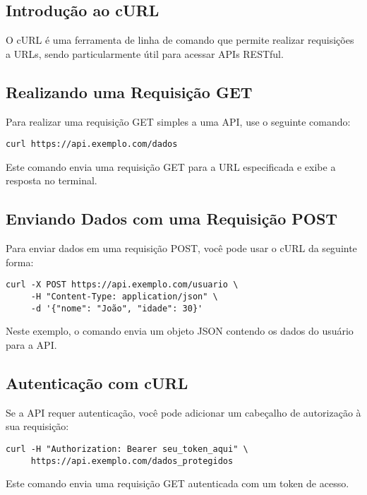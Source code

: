 \subsection{Introdução ao cURL}
O cURL é uma ferramenta de linha de comando que permite realizar requisições a URLs, sendo particularmente útil para acessar APIs RESTful.

\subsection{Realizando uma Requisição GET}
Para realizar uma requisição GET simples a uma API, use o seguinte comando:
\begin{verbatim}
curl https://api.exemplo.com/dados
\end{verbatim}
Este comando envia uma requisição GET para a URL especificada e exibe a resposta no terminal.

\subsection{Enviando Dados com uma Requisição POST}
Para enviar dados em uma requisição POST, você pode usar o cURL da seguinte forma:
\begin{verbatim}
curl -X POST https://api.exemplo.com/usuario \
     -H "Content-Type: application/json" \
     -d '{"nome": "João", "idade": 30}'
\end{verbatim}
Neste exemplo, o comando envia um objeto JSON contendo os dados do usuário para a API.

\subsection{Autenticação com cURL}
Se a API requer autenticação, você pode adicionar um cabeçalho de autorização à sua requisição:
\begin{verbatim}
curl -H "Authorization: Bearer seu_token_aqui" \
     https://api.exemplo.com/dados_protegidos
\end{verbatim}
Este comando envia uma requisição GET autenticada com um token de acesso.

